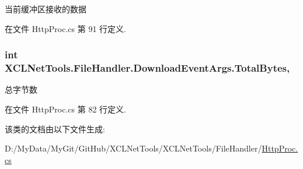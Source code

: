 当前缓冲区接收的数据 



在文件 Http\-Proc.\-cs 第 91 行定义.

\hypertarget{class_x_c_l_net_tools_1_1_file_handler_1_1_download_event_args_a344cbcca5a213a50ecd25b90340be816}{
\subsubsection[{Total\-Bytes}]{\setlength{\rightskip}{0pt plus 5cm}int X\-C\-L\-Net\-Tools.\-File\-Handler.\-Download\-Event\-Args.\-Total\-Bytes\hspace{0.3cm}{\ttfamily [get]}, {\ttfamily [set]}}}\label{class_x_c_l_net_tools_1_1_file_handler_1_1_download_event_args_a344cbcca5a213a50ecd25b90340be816}


总字节数 



在文件 Http\-Proc.\-cs 第 82 行定义.



该类的文档由以下文件生成\-:\begin{DoxyCompactItemize}
\item 
D\-:/\-My\-Data/\-My\-Git/\-Git\-Hub/\-X\-C\-L\-Net\-Tools/\-X\-C\-L\-Net\-Tools/\-File\-Handler/\hyperlink{_http_proc_8cs}{Http\-Proc.\-cs}\end{DoxyCompactItemize}
